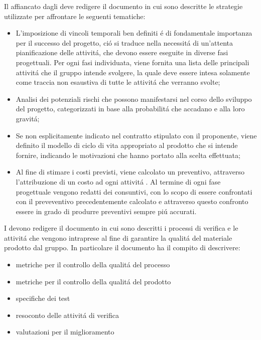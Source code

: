 Il \responsabile{} affiancato dagli \amministratori{} deve redigere il documento \PdPv{} in cui sono descritte le strategie utilizzate per affrontare le seguenti tematiche:

\begin{itemize}
    \item L'imposizione di vincoli temporali ben definiti \'{e} di fondamentale importanza per il successo del progetto, ci\'o si traduce nella necessit\'a di un'attenta pianificazione delle attivit\'a, che devono essere eseguite in diverse fasi progettuali. Per ogni fasi individuata, viene fornita una lista delle principali attivit\'a che il gruppo intende svolgere, la quale deve essere intesa solamente come traccia non esaustiva di tutte le attivit\'a che verranno svolte;
    \item Analisi dei potenziali rischi che possono manifestarsi nel corso dello sviluppo del progetto, categorizzati in base alla probabilit\'a che accadano e alla loro gravit\'a;
    \item Se non esplicitamente indicato nel contratto stipulato con il proponente, viene definito il modello di ciclo di vita appropriato al prodotto che si intende fornire, indicando le motivazioni che hanno portato alla scelta effettuata;
    \item Al fine di stimare i costi previsti, viene calcolato un preventivo, attraverso l'attribuzione di un costo ad ogni attivit\'a . Al termine di ogni fase progettuale vengono redatti dei consuntivi, con lo scopo di essere confrontati con il preveventivo precedentemente calcolato e attraverso questo confronto essere in grado di produrre preventivi sempre pi\'u accurati.
\end{itemize}

I \verificatori{} devono redigere il documento \PdQv{} in cui sono descritti i processi di verifica e le attivit\'a che vengono intraprese al fine di garantire la qualit\'a del materiale prodotto dal gruppo. In particolare il documento ha il compito di descrivere:

\begin{itemize}
    \item metriche per il controllo della qualit\'a del processo
    \item metriche per il controllo della qualit\'a del prodotto
    \item specifiche dei test
    \item resoconto delle attivit\'a di verifica
    \item valutazioni per il miglioramento
\end{itemize}